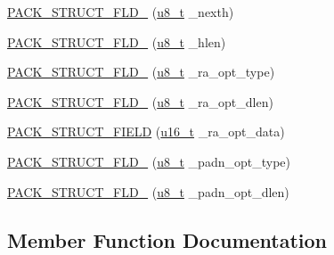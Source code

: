 \begin{DoxyCompactItemize}
\item 
\hyperlink{structip6__hbh__hdr_a555a70b055779d096f51d359860ca93f}{P\+A\+C\+K\+\_\+\+S\+T\+R\+U\+C\+T\+\_\+\+F\+L\+D\+\_} (\hyperlink{group__compiler__abstraction_ga4caecabca98b43919dd11be1c0d4cd8e}{u8\+\_\+t} \+\_\+nexth)
\item 
\hyperlink{structip6__hbh__hdr_a0af943853d4729d00dc384e251669690}{P\+A\+C\+K\+\_\+\+S\+T\+R\+U\+C\+T\+\_\+\+F\+L\+D\+\_} (\hyperlink{group__compiler__abstraction_ga4caecabca98b43919dd11be1c0d4cd8e}{u8\+\_\+t} \+\_\+hlen)
\item 
\hyperlink{structip6__hbh__hdr_a42ffd2ead66ca2b9f2856afd26d471f6}{P\+A\+C\+K\+\_\+\+S\+T\+R\+U\+C\+T\+\_\+\+F\+L\+D\+\_} (\hyperlink{group__compiler__abstraction_ga4caecabca98b43919dd11be1c0d4cd8e}{u8\+\_\+t} \+\_\+ra\+\_\+opt\+\_\+type)
\item 
\hyperlink{structip6__hbh__hdr_abae41884e75c0d0b08ec9e16a19bf9b9}{P\+A\+C\+K\+\_\+\+S\+T\+R\+U\+C\+T\+\_\+\+F\+L\+D\+\_} (\hyperlink{group__compiler__abstraction_ga4caecabca98b43919dd11be1c0d4cd8e}{u8\+\_\+t} \+\_\+ra\+\_\+opt\+\_\+dlen)
\item 
\hyperlink{structip6__hbh__hdr_a5dff82e0d8756b04febd936e23b989da}{P\+A\+C\+K\+\_\+\+S\+T\+R\+U\+C\+T\+\_\+\+F\+I\+E\+LD} (\hyperlink{group__compiler__abstraction_ga77570ac4fcab86864fa1916e55676da2}{u16\+\_\+t} \+\_\+ra\+\_\+opt\+\_\+data)
\item 
\hyperlink{structip6__hbh__hdr_a3696ea1fb4f8f8bd3f5e18e6d0303cf6}{P\+A\+C\+K\+\_\+\+S\+T\+R\+U\+C\+T\+\_\+\+F\+L\+D\+\_} (\hyperlink{group__compiler__abstraction_ga4caecabca98b43919dd11be1c0d4cd8e}{u8\+\_\+t} \+\_\+padn\+\_\+opt\+\_\+type)
\item 
\hyperlink{structip6__hbh__hdr_afc8d541ae3a0368a9fb83f6f85a0d67e}{P\+A\+C\+K\+\_\+\+S\+T\+R\+U\+C\+T\+\_\+\+F\+L\+D\+\_} (\hyperlink{group__compiler__abstraction_ga4caecabca98b43919dd11be1c0d4cd8e}{u8\+\_\+t} \+\_\+padn\+\_\+opt\+\_\+dlen)
\end{DoxyCompactItemize}


\subsection{Member Function Documentation}
\mbox{\label{structip6__hbh__hdr_a5dff82e0d8756b04febd936e23b989da}} 
